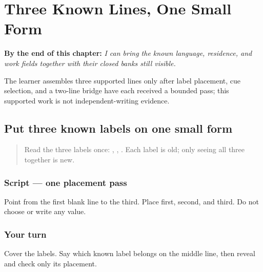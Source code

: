 
\chapter{Three Known Lines, One Small Form}
\label{ch:pa-form-three-preparation}

\begin{chapteropening}
\textbf{By the end of this chapter:} \emph{I can bring the known language, residence, and work fields together with their closed banks still visible.}

The learner assembles three supported lines only after label placement, cue selection, and a two-line bridge have each received a bounded pass; this supported work is not independent-writing evidence.
\end{chapteropening}

\section[\texorpdfstring{\pa{ਭਾਸ਼ਾ} · \pa{ਰਿਹਾਇਸ਼} · \pa{ਕੰਮ} (three known form …)}{ਭਾਸ਼ਾ · ਰਿਹਾਇਸ਼ · ਕੰਮ (three known form …)}]{Put three known labels on one small form}

\label{lesson:PA-W06-three-field-labels}



\begin{quote}
Read the three labels once: \textbf{}, \textbf{}, \textbf{}. Each label is old; only seeing all three together is new.
\end{quote}

\subsection*{Script — one placement pass}
Point from the first blank line to the third. Place \textbf{} first, \textbf{} second, and \textbf{} third. Do not choose or write any value.

\subsection*{Your turn}
Cover the labels. Say which known label belongs on the middle line, then reveal and check only its placement.

